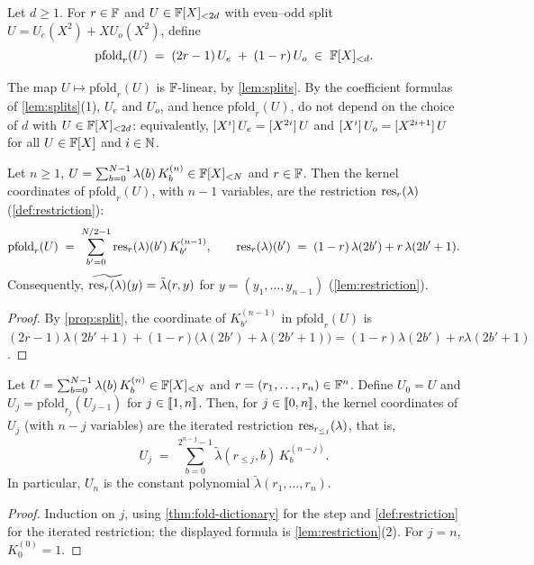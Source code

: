 \begin{definition}\label{def:fold-poly}
Let $d \ge 1$. For $r \in \mathbb{F}$ and $U \in \mathbb{F}[X]_{<2d}$ with even--odd split $U = U_e(X^2) + X U_o(X^2)$, define
\[
  \mathrm{pfold}_r(U) \;=\; (2r-1)\,U_e \;+\; (1-r)\,U_o \;\in\; \mathbb{F}[X]_{<d}.
\]
\end{definition}

The map $U \mapsto \mathrm{pfold}_r(U)$ is $\mathbb{F}$-linear, by \cref{lem:splits}.
By the coefficient formulas of \cref{lem:splits}(1), $U_e$ and $U_o$, and hence $\mathrm{pfold}_r(U)$, do not depend on the choice of $d$ with $U \in \mathbb{F}[X]_{<2d}$: equivalently, $[X^{i}]\,U_e = [X^{2i}]\,U$ and $[X^{i}]\,U_o = [X^{2i+1}]\,U$ for all $U \in \mathbb{F}[X]$ and $i \in \mathbb{N}$.

\begin{theorem}\label{thm:fold-dictionary}
Let $n \ge 1$, $U = \sum_{b=0}^{N-1} \lambda(b)\, K^{(n)}_b \in \mathbb{F}[X]_{<N}$ and $r \in \mathbb{F}$. Then the kernel coordinates of $\mathrm{pfold}_r(U)$, with $n-1$ variables, are the restriction $\mathrm{res}_r(\lambda)$ (\cref{def:restriction}):
\[
  \mathrm{pfold}_r(U) \;=\; \sum_{b'=0}^{N/2-1} \mathrm{res}_r(\lambda)(b')\, K^{(n-1)}_{b'},
  \qquad
  \mathrm{res}_r(\lambda)(b') \;=\; (1-r)\,\lambda(2b') + r\,\lambda(2b'+1).
\]
Consequently, $\widetilde{\mathrm{res}_r(\lambda)}(y) = \tilde\lambda(r, y)$ for $y = (y_1,\dots,y_{n-1})$ (\cref{lem:restriction}).
\end{theorem}

\begin{proof}
By \cref{prop:split}, the coordinate of $K^{(n-1)}_{b'}$ in $\mathrm{pfold}_r(U)$ is
$(2r-1)\lambda(2b'+1) + (1-r)\bigl(\lambda(2b') + \lambda(2b'+1)\bigr) = (1-r)\lambda(2b') + r\lambda(2b'+1)$.
\end{proof}

\begin{corollary}\label{cor:iterated}
Let $U = \sum_{b=0}^{N-1} \lambda(b)\, K^{(n)}_b \in \mathbb{F}[X]_{<N}$ and $r = (r_1,\dots,r_n) \in \mathbb{F}^n$.
Define $U_0 = U$ and $U_j = \mathrm{pfold}_{r_j}(U_{j-1})$ for $j \in \llbracket 1, n \rrbracket$.
Then, for $j \in \llbracket 0, n \rrbracket$, the kernel coordinates of $U_j$ (with $n-j$ variables) are the iterated restriction $\mathrm{res}_{r_{\le j}}(\lambda)$, that is,
\[
  U_j \;=\; \sum_{b=0}^{2^{n-j}-1} \tilde\lambda(r_{\le j}, b)\, K^{(n-j)}_b .
\]
In particular, $U_n$ is the constant polynomial $\tilde\lambda(r_1,\dots,r_n)$.
\end{corollary}

\begin{proof}
Induction on $j$, using \cref{thm:fold-dictionary} for the step and \cref{def:restriction} for the iterated restriction; the displayed formula is \cref{lem:restriction}(2).
For $j = n$, $K^{(0)}_0 = 1$.
\end{proof}

